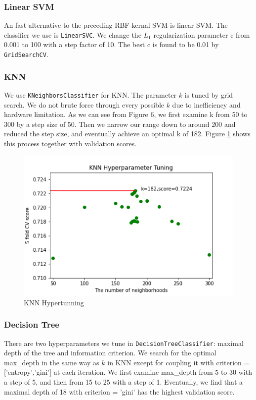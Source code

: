 \documentclass[10pt,twocolumn]{article}
\begin{document}
	\subsubsection{Linear SVM}
	An fast alternative to the preceding RBF-kernal SVM is linear SVM. The classifier we use is \texttt{LinearSVC}. We change the $L_1$ regularization parameter c from 0.001 to 100 with a step factor of 10. The best c is found to be 0.01 by \texttt{GridSearchCV}.
	\subsubsection{KNN}
	We use \texttt{KNeighborsClassifier} for KNN. The parameter $k$ is tuned by grid search. We do not brute force through every possible $k$ due to inefficiency and hardware limitation. As we can see from Figure 6, we first examine k from 50 to 300 by a step size of 50. Then we narrow our range down to around 200 and reduced the step size, and eventually achieve an optimal k of 182. Figure \ref{KNN_hyper_tune} shows this process together with validation scores. 
	\begin{figure}[H]
		\includegraphics[width=\columnwidth]{KNN_hyper_tune}
		\caption{KNN Hypertunning}\label{KNN_hyper_tune}
	\end{figure}
	\subsubsection{Decision Tree}
	There are two hyperparameters we tune in \texttt{DecisionTreeClassifier}: maximal depth of the tree and information criterion. We search for the optimal max\_depth in the same way as $k$ in KNN except for coupling it with criterion = ['entropy','gini'] at each iteration. We first examine max\_depth from 5 to 30 with a step of 5, and then from 15 to 25 with a step of 1. Eventually, we find that a maximal depth of 18 with criterion = 'gini' has the highest validation score.
\end{document}
